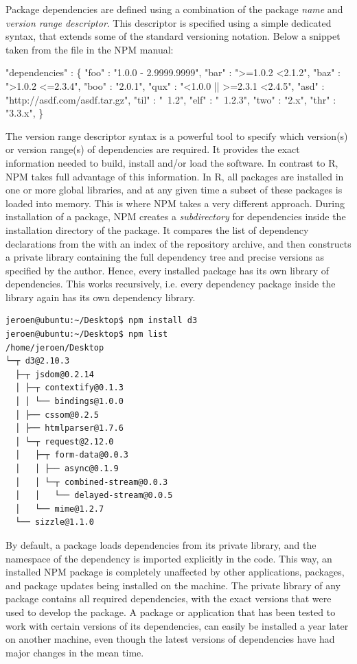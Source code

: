 Package dependencies are defined using a combination of the package \emph{name}
and \emph{version range descriptor}. This descriptor is specified using a
simple dedicated syntax, that extends some of the standard versioning notation.
Below a snippet taken from the  file in the NPM manual:

\begin{example}
   "dependencies" : \{
      "foo" : "1.0.0 - 2.9999.9999",
      "bar" : ">=1.0.2 <2.1.2",
      "baz" : ">1.0.2 <=2.3.4",
      "boo" : "2.0.1",
      "qux" : "<1.0.0 || >=2.3.1 <2.4.5",
      "asd" : "http://asdf.com/asdf.tar.gz",
      "til" : "~1.2",
      "elf" : "~1.2.3",
      "two" : "2.x",
      "thr" : "3.3.x",
   \}
\end{example}

\noindent The version range descriptor syntax is a powerful tool to specify
which version(s) or version range(s) of dependencies are required. It provides the exact
information needed to build, install and/or load the software. In contrast to R,
NPM takes full advantage of this information. In R, all packages are installed
in one or more global libraries, and at any given time a subset of these packages
is loaded into memory. This is where NPM takes a very different approach. During
installation of a package, NPM creates a \emph{subdirectory} for dependencies inside
the installation directory of the package. It compares the list of dependency
declarations from the  with an index of the repository archive,
and then constructs a private library containing the full dependency tree and precise
versions as specified by the author. Hence, every installed package has its own library
of dependencies. This works recursively, i.e. every dependency package inside
the library again has its own dependency library.

\begin{verbatim}
jeroen@ubuntu:~/Desktop$ npm install d3
jeroen@ubuntu:~/Desktop$ npm list
/home/jeroen/Desktop
└─┬ d3@2.10.3
  ├─┬ jsdom@0.2.14
  │ ├─┬ contextify@0.1.3
  │ │ └── bindings@1.0.0
  │ ├── cssom@0.2.5
  │ ├── htmlparser@1.7.6
  │ └─┬ request@2.12.0
  │   ├─┬ form-data@0.0.3
  │   │ ├── async@0.1.9
  │   │ └─┬ combined-stream@0.0.3
  │   │   └── delayed-stream@0.0.5
  │   └── mime@1.2.7
  └── sizzle@1.1.0
\end{verbatim}

\noindent By default, a package loads dependencies from its private library, and
the namespace of the dependency is imported explicitly in the code. This way, an
installed NPM package is completely unaffected by other applications, packages,
and package updates being installed on the machine. The private library of any
package contains all required dependencies, with the exact versions that
were used to develop the package. A package or application that has been
tested to work with certain versions of its dependencies, can easily be
installed a year later on another machine, even though the latest versions of
dependencies have had major changes in the mean time.

